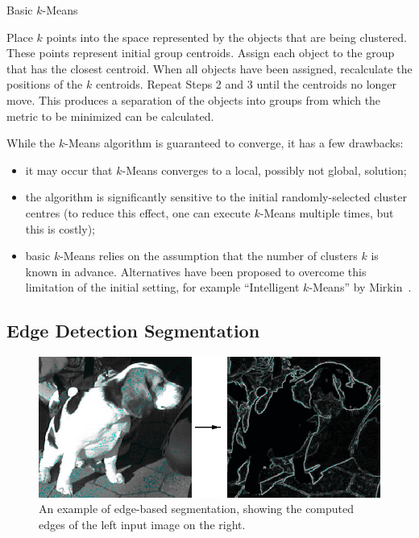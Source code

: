 \begin{algorithm}
\caption{Basic $k$-Means}
\label{algo:kmeans} 
\begin{algorithmic}[1]
\STATE Place $k$ points into the space represented by the objects that are being clustered. These points represent initial group centroids.
\STATE Assign each object to the group that has the closest centroid.
\STATE When all objects have been assigned, recalculate the positions of the $k$ centroids. 
\STATE Repeat Steps 2 and 3 until the centroids no longer move. This produces a separation of the objects into groups from which the metric to be minimized can be calculated.
\end{algorithmic}
\end{algorithm}

While the $k$-Means algorithm is guaranteed to converge, it has a few drawbacks:
\begin{itemize}
\item it may occur that $k$-Means converges to a local, possibly not global, solution;

\item the algorithm is significantly sensitive to the initial randomly-selected cluster centres (to reduce this effect, one can execute $k$-Means multiple times, but this is costly);

\item basic $k$-Means relies on the assumption that the number of clusters $k$ is known in advance. Alternatives have been proposed to overcome this limitation of the initial setting, for example ``Intelligent $k$-Means'' by Mirkin~\cite[p.~93]{mirkin}.
\end{itemize}


\subsection{Edge Detection Segmentation}
\label{sec:edge_det} 

\begin{figure}
\centering
\includegraphics[scale=0.45]{figures/dog_edges}
\caption[Edge-based segmentation]{An example of edge-based segmentation, showing the computed edges of the left input image on the right.}
\label{img:dog_edges}
\end{figure}


